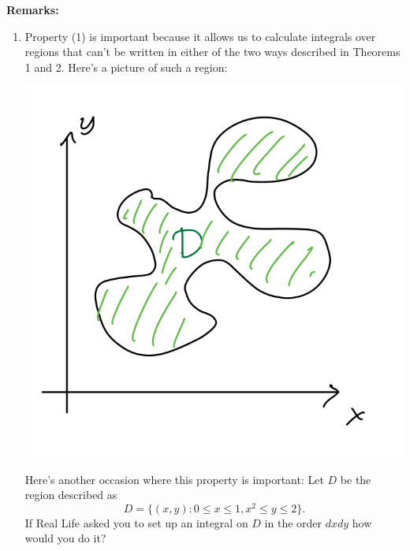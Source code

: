 \documentclass[12pt]{article}
\begin{document}
\textbf{Remarks:}
\begin{enumerate}
\item Property (1) is important because it allows us to calculate integrals over regions that can't be written in either of the two ways described in Theorems 1 and 2. Here's a picture of such a region:

\includegraphics[scale=.2]{bad.jpeg}

Here's another occasion where this property is important: Let $D$ be the region described as $$D=\{(x,y):0\leq x\leq 1, x^2\leq y\leq 2\}.$$ If Real Life asked you to set up an integral on $D$ in the order $dxdy$ how would you do it?


\end{enumerate}
\end{document}
